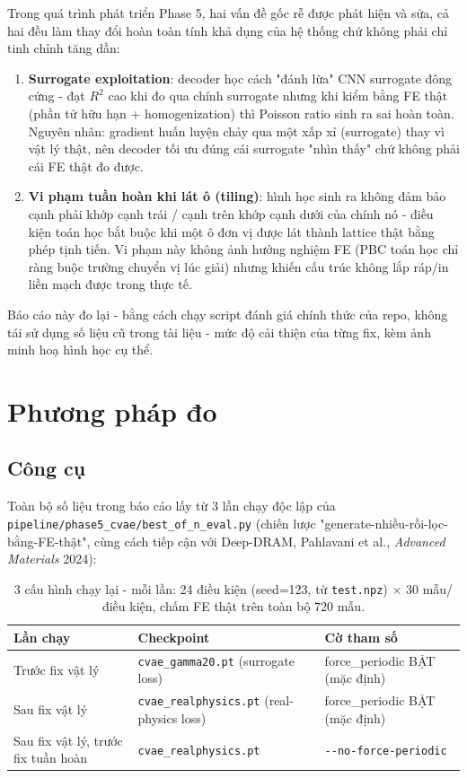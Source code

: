 \documentclass[11pt,a4paper]{article}
\begin{document}
Trong quá trình phát triển Phase 5, hai vấn đề gốc rễ được phát hiện và sửa, cả hai đều làm thay
đổi hoàn toàn tính khả dụng của hệ thống chứ không phải chỉ tinh chỉnh tăng dần:

\begin{enumerate}[leftmargin=1.4em]
  \item \textbf{Surrogate exploitation}: decoder học cách "đánh lừa" CNN surrogate đông cứng -
  đạt $R^2$ cao khi đo qua chính surrogate nhưng khi kiểm bằng FE thật (phần tử hữu hạn +
  homogenization) thì Poisson ratio sinh ra sai hoàn toàn. Nguyên nhân: gradient huấn luyện chảy
  qua một xấp xỉ (surrogate) thay vì vật lý thật, nên decoder tối ưu đúng cái surrogate "nhìn
  thấy" chứ không phải cái FE thật đo được.
  \item \textbf{Vi phạm tuần hoàn khi lát ô (tiling)}: hình học sinh ra không đảm bảo cạnh phải
  khớp cạnh trái / cạnh trên khớp cạnh dưới của chính nó - điều kiện toán học bắt buộc khi một ô
  đơn vị được lát thành lattice thật bằng phép tịnh tiến. Vi phạm này không ảnh hưởng nghiệm FE
  (PBC toán học chỉ ràng buộc trường chuyển vị lúc giải) nhưng khiến cấu trúc không lắp ráp/in
  liền mạch được trong thực tế.
\end{enumerate}

Báo cáo này đo lại - bằng cách chạy script đánh giá chính thức của repo, không tái sử dụng số
liệu cũ trong tài liệu - mức độ cải thiện của từng fix, kèm ảnh minh hoạ hình học cụ thể.

\section{Phương pháp đo}
\label{sec:method}

\subsection{Công cụ}
Toàn bộ số liệu trong báo cáo lấy từ 3 lần chạy độc lập của
\texttt{pipeline/phase5\_cvae/best\_of\_n\_eval.py} (chiến lược "generate-nhiều-rồi-lọc-bằng-FE-thật",
cùng cách tiếp cận với Deep-DRAM, Pahlavani et al., \textit{Advanced Materials} 2024):

\begin{table}[H]
\centering
\small
\begin{tabular}{@{}lll@{}}
\toprule
\textbf{Lần chạy} & \textbf{Checkpoint} & \textbf{Cờ tham số} \\
\midrule
Trước fix vật lý & \texttt{cvae\_gamma20.pt} (surrogate loss) & force\_periodic BẬT (mặc định) \\
Sau fix vật lý & \texttt{cvae\_realphysics.pt} (real-physics loss) & force\_periodic BẬT (mặc định) \\
Sau fix vật lý, trước fix tuần hoàn & \texttt{cvae\_realphysics.pt} & \texttt{-{}-no-force-periodic} \\
\bottomrule
\end{tabular}
\caption{3 cấu hình chạy lại - mỗi lần: 24 điều kiện (seed=123, từ \texttt{test.npz}) $\times$ 30
mẫu/điều kiện, chấm FE thật trên toàn bộ 720 mẫu.}
\end{table}
\end{document}
